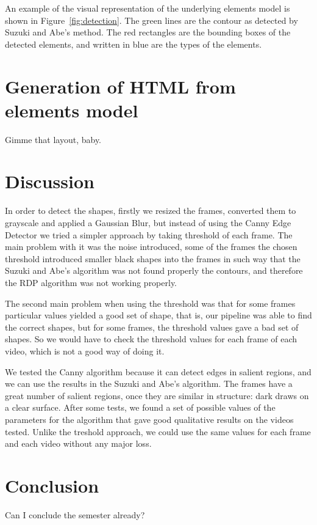 \documentclass[]{IEEEtran}
\begin{document}
  An example of the visual representation of the underlying elements model is shown in Figure~\ref{fig:detection}. The green lines are the contour as detected by Suzuki and Abe's method. The red rectangles are the bounding boxes of the detected elements, and written in blue are the types of the elements.

  \section{Generation of HTML from elements model}
  Gimme that layout, baby.

  \section{Discussion}
  \label{sec:discussion}
  In order to detect the shapes, firstly we resized the frames, converted them to grayscale and applied a Gaussian Blur, but instead of using the Canny Edge Detector we tried a simpler approach by taking threshold of each frame. The main problem with it was the noise introduced, some of the frames the chosen threshold introduced smaller black shapes into the frames in such way that the Suzuki and Abe's algorithm was not found properly the contours, and therefore the RDP algorithm was not working properly.

  The second main problem when using the threshold was that for some frames particular values yielded a good set of shape, that is, our pipeline was able to find the correct shapes, but for some frames, the threshold values gave a bad set of shapes. So we would have to check the threshold values for each frame of each video, which is not a good way of doing it.

  We tested the Canny algorithm because it can detect edges in salient regions, and we can use the results in the Suzuki and  Abe's algorithm. The frames have a great number of salient regions, once they are similar in structure: dark draws on a clear surface. After some tests, we found a set of possible values of the parameters for the algorithm that gave good qualitative results on the videos tested. Unlike the treshold approach, we could use the same values for each frame and each video without any major loss.

  \section{Conclusion}
  Can I conclude the semester already?
\end{document}
